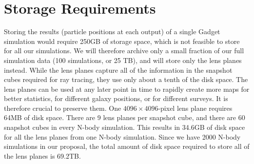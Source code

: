 \documentclass[10pt, preprint]{aastex}
\begin{document}
\section{Storage Requirements}

Storing the results (particle positions at each output) of a single
Gadget simulation would require 250GB of storage space, which is not
feasible to store for all our simulations. We will therefore archive
only a small fraction of our full simulation data (100 simulations, or
25 TB), and will store only the lens planes instead.  While the lens
planes capture all of the information in the snapshot cubes required
for ray tracing, they use only about a tenth of the disk space. The
lens planes can be used at any later point in time to rapidly create
more maps for better statistics, for different galaxy positions, or
for different surveys. It is therefore crucial to preserve them. One
$4096 \times 4096$-pixel lens plane requires 64MB of disk space. There
are 9 lens planes per snapshot cube, and there are 60 snapshot cubes
in every N-body simulation. This results in 34.6GB of disk space for
all the lens planes from one N-body simulation. Since we have 2000
N-body simulations in our proposal, the total amount of disk space
required to store all of the lens planes is 69.2TB.



\end{document}
